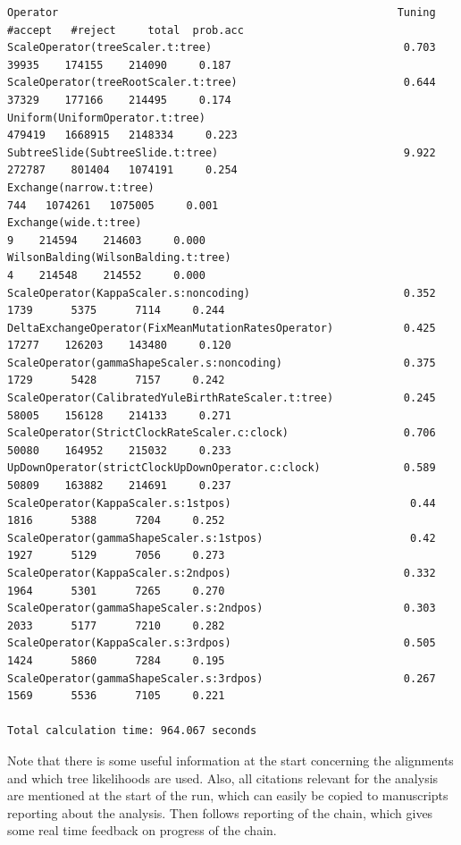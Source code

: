\documentclass[11pt]{article}
\theoremstyle{plain}%
\theoremstyle{definition}
\theoremstyle{remark}
\begin{document}
{\begin{verbatim}
Operator                                                     Tuning   #accept   #reject     total  prob.acc
ScaleOperator(treeScaler.t:tree)                              0.703     39935    174155    214090     0.187 
ScaleOperator(treeRootScaler.t:tree)                          0.644     37329    177166    214495     0.174 
Uniform(UniformOperator.t:tree)                                        479419   1668915   2148334     0.223 
SubtreeSlide(SubtreeSlide.t:tree)                             9.922    272787    801404   1074191     0.254 
Exchange(narrow.t:tree)                                                   744   1074261   1075005     0.001 
Exchange(wide.t:tree)                                                       9    214594    214603     0.000 
WilsonBalding(WilsonBalding.t:tree)                                         4    214548    214552     0.000 
ScaleOperator(KappaScaler.s:noncoding)                        0.352      1739      5375      7114     0.244 
DeltaExchangeOperator(FixMeanMutationRatesOperator)           0.425     17277    126203    143480     0.120 
ScaleOperator(gammaShapeScaler.s:noncoding)                   0.375      1729      5428      7157     0.242 
ScaleOperator(CalibratedYuleBirthRateScaler.t:tree)           0.245     58005    156128    214133     0.271 
ScaleOperator(StrictClockRateScaler.c:clock)                  0.706     50080    164952    215032     0.233 
UpDownOperator(strictClockUpDownOperator.c:clock)             0.589     50809    163882    214691     0.237 
ScaleOperator(KappaScaler.s:1stpos)                            0.44      1816      5388      7204     0.252 
ScaleOperator(gammaShapeScaler.s:1stpos)                       0.42      1927      5129      7056     0.273 
ScaleOperator(KappaScaler.s:2ndpos)                           0.332      1964      5301      7265     0.270 
ScaleOperator(gammaShapeScaler.s:2ndpos)                      0.303      2033      5177      7210     0.282 
ScaleOperator(KappaScaler.s:3rdpos)                           0.505      1424      5860      7284     0.195 
ScaleOperator(gammaShapeScaler.s:3rdpos)                      0.267      1569      5536      7105     0.221 

Total calculation time: 964.067 seconds
\end{verbatim}}

Note that there is some useful information at the start concerning the alignments and which tree likelihoods are used. Also, all citations relevant for the analysis are mentioned at the start of the run, which can easily be copied to
manuscripts reporting about the analysis. Then follows reporting of the chain,
which gives some real time feedback on progress of the chain.
\end{document}
